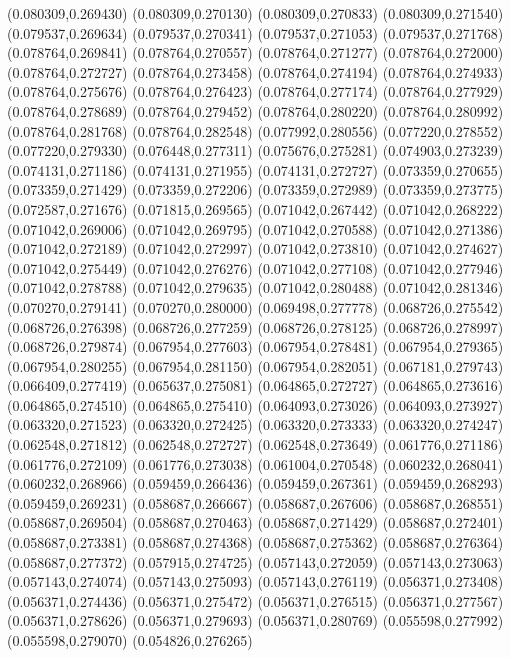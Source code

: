 (0.080309,0.269430)
(0.080309,0.270130)
(0.080309,0.270833)
(0.080309,0.271540)
(0.079537,0.269634)
(0.079537,0.270341)
(0.079537,0.271053)
(0.079537,0.271768)
(0.078764,0.269841)
(0.078764,0.270557)
(0.078764,0.271277)
(0.078764,0.272000)
(0.078764,0.272727)
(0.078764,0.273458)
(0.078764,0.274194)
(0.078764,0.274933)
(0.078764,0.275676)
(0.078764,0.276423)
(0.078764,0.277174)
(0.078764,0.277929)
(0.078764,0.278689)
(0.078764,0.279452)
(0.078764,0.280220)
(0.078764,0.280992)
(0.078764,0.281768)
(0.078764,0.282548)
(0.077992,0.280556)
(0.077220,0.278552)
(0.077220,0.279330)
(0.076448,0.277311)
(0.075676,0.275281)
(0.074903,0.273239)
(0.074131,0.271186)
(0.074131,0.271955)
(0.074131,0.272727)
(0.073359,0.270655)
(0.073359,0.271429)
(0.073359,0.272206)
(0.073359,0.272989)
(0.073359,0.273775)
(0.072587,0.271676)
(0.071815,0.269565)
(0.071042,0.267442)
(0.071042,0.268222)
(0.071042,0.269006)
(0.071042,0.269795)
(0.071042,0.270588)
(0.071042,0.271386)
(0.071042,0.272189)
(0.071042,0.272997)
(0.071042,0.273810)
(0.071042,0.274627)
(0.071042,0.275449)
(0.071042,0.276276)
(0.071042,0.277108)
(0.071042,0.277946)
(0.071042,0.278788)
(0.071042,0.279635)
(0.071042,0.280488)
(0.071042,0.281346)
(0.070270,0.279141)
(0.070270,0.280000)
(0.069498,0.277778)
(0.068726,0.275542)
(0.068726,0.276398)
(0.068726,0.277259)
(0.068726,0.278125)
(0.068726,0.278997)
(0.068726,0.279874)
(0.067954,0.277603)
(0.067954,0.278481)
(0.067954,0.279365)
(0.067954,0.280255)
(0.067954,0.281150)
(0.067954,0.282051)
(0.067181,0.279743)
(0.066409,0.277419)
(0.065637,0.275081)
(0.064865,0.272727)
(0.064865,0.273616)
(0.064865,0.274510)
(0.064865,0.275410)
(0.064093,0.273026)
(0.064093,0.273927)
(0.063320,0.271523)
(0.063320,0.272425)
(0.063320,0.273333)
(0.063320,0.274247)
(0.062548,0.271812)
(0.062548,0.272727)
(0.062548,0.273649)
(0.061776,0.271186)
(0.061776,0.272109)
(0.061776,0.273038)
(0.061004,0.270548)
(0.060232,0.268041)
(0.060232,0.268966)
(0.059459,0.266436)
(0.059459,0.267361)
(0.059459,0.268293)
(0.059459,0.269231)
(0.058687,0.266667)
(0.058687,0.267606)
(0.058687,0.268551)
(0.058687,0.269504)
(0.058687,0.270463)
(0.058687,0.271429)
(0.058687,0.272401)
(0.058687,0.273381)
(0.058687,0.274368)
(0.058687,0.275362)
(0.058687,0.276364)
(0.058687,0.277372)
(0.057915,0.274725)
(0.057143,0.272059)
(0.057143,0.273063)
(0.057143,0.274074)
(0.057143,0.275093)
(0.057143,0.276119)
(0.056371,0.273408)
(0.056371,0.274436)
(0.056371,0.275472)
(0.056371,0.276515)
(0.056371,0.277567)
(0.056371,0.278626)
(0.056371,0.279693)
(0.056371,0.280769)
(0.055598,0.277992)
(0.055598,0.279070)
(0.054826,0.276265)
